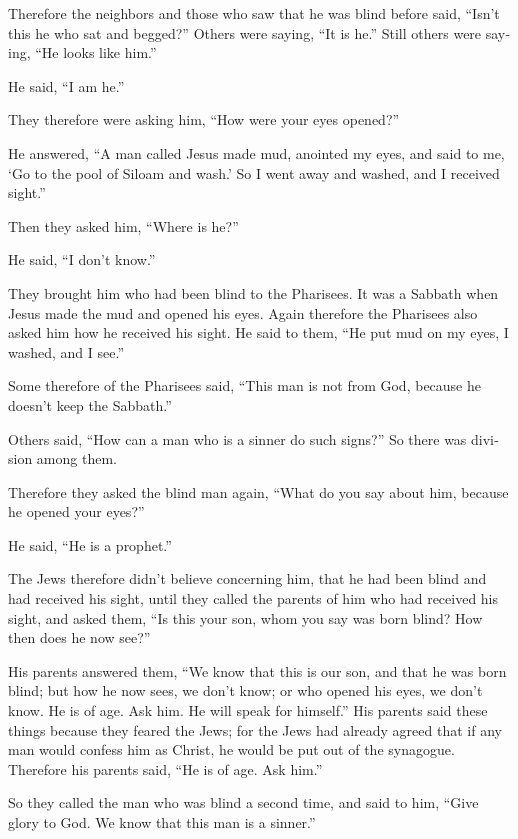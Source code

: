 \begin{paracol}{2}
\begin{otherlanguage}{english}
 Therefore the neighbors and those who saw that he was
blind before said, ``Isn't this he who sat and begged?'' 
Others were saying, ``It is he.'' Still others were saying, ``He looks
like him.''

He said, ``I am he.''

 They therefore were asking him, ``How were your eyes
opened?''

 He answered, ``A man called Jesus made mud, anointed my
eyes, and said to me, `Go to the pool of Siloam and wash.' So I went
away and washed, and I received sight.''

 Then they asked him, ``Where is he?''

He said, ``I don't know.''

 They brought him who had been blind to the Pharisees.
 It was a Sabbath when Jesus made the mud and opened his
eyes.  Again therefore the Pharisees also asked him how
he received his sight. He said to them, ``He put mud on my eyes, I
washed, and I see.''

 Some therefore of the Pharisees said, ``This man is not
from God, because he doesn't keep the Sabbath.''

Others said, ``How can a man who is a sinner do such signs?'' So there
was division among them.

 Therefore they asked the blind man again, ``What do you
say about him, because he opened your eyes?''

He said, ``He is a prophet.''

 The Jews therefore didn't believe concerning him, that
he had been blind and had received his sight, until they called the
parents of him who had received his sight,  and asked
them, ``Is this your son, whom you say was born blind? How then does he
now see?''

 His parents answered them, ``We know that this is our
son, and that he was born blind;  but how he now sees, we
don't know; or who opened his eyes, we don't know. He is of age. Ask
him. He will speak for himself.''  His parents said these
things because they feared the Jews; for the Jews had already agreed
that if any man would confess him as Christ, he would be put out of the
synagogue.  Therefore his parents said, ``He is of age.
Ask him.''

 So they called the man who was blind a second time, and
said to him, ``Give glory to God. We know that this man is a sinner.''


\end{otherlanguage}
\end{paracol}
